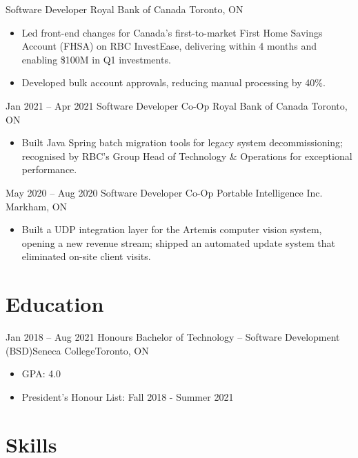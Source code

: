 \documentclass[letterpaper]{moderncv}
\begin{document}
{Software Developer}
{Royal Bank of Canada}
{Toronto, ON}
{}
{\begin{itemize}%
	\item Led front-end changes for Canada's first-to-market First Home Savings Account (FHSA) on RBC InvestEase, delivering within 4 months and enabling \$100M in Q1 investments.
	\item Developed bulk account approvals, reducing manual processing by 40\%.
	\end{itemize}}
\cventry
{Jan 2021 -- Apr 2021}
{Software Developer Co-Op}
{Royal Bank of Canada}
{Toronto, ON}
{}
{\begin{itemize}%
	\item Built Java Spring batch migration tools for legacy system decommissioning; recognised by RBC's Group Head of Technology \& Operations for exceptional performance.
	\end{itemize}}
\cventry
{May 2020 -- Aug 2020}
{Software Developer Co-Op}
{Portable Intelligence Inc.}
{Markham, ON}
{}
{\begin{itemize}%
	\item Built a UDP integration layer for the Artemis computer vision system, opening a new revenue stream; shipped an automated update system that eliminated on-site client visits.
	\end{itemize}}

\section{Education}
\cventry
{Jan 2018 -- Aug 2021}
{Honours Bachelor of Technology – Software Development (BSD)}{Seneca College}{Toronto, ON}{}
{\begin{itemize}%
	\item GPA: 4.0
	\item President's Honour List: Fall 2018 - Summer 2021
	\end{itemize}}

\section{Skills}
\end{document}
